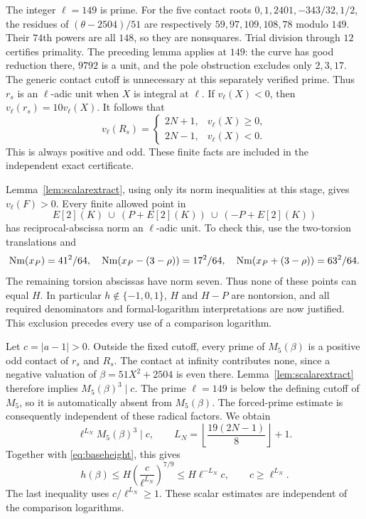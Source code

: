 \documentclass[11pt,a4paper]{article}
\begin{document}
The integer $\ell=149$ is prime. For the five contact roots
$0,1,2401,-343/32,1/2$, the residues of $(\theta-2504)/51$ are
respectively $59,97,109,108,78$ modulo $149$. Their $74$th powers
are all $148$, so they are nonsquares. Trial division through $12$
certifies primality. The preceding lemma applies at $149$: the curve
has good reduction there, $9792$ is a unit, and the pole obstruction
excludes only $2,3,17$. The generic contact cutoff is unnecessary
at this separately verified prime. Thus $r_s$ is an $\ell$-adic unit when $X$ is integral
at $\ell$. If $v_\ell(X)<0$, then $v_\ell(r_s)=10v_\ell(X)$.
It follows that
\begin{equation}\label{eq:forcedvaluation}
 v_\ell(R_s)=
 \begin{cases}2N+1,&v_\ell(X)\ge0,\\2N-1,&v_\ell(X)<0.
 \end{cases}
\end{equation}
This is always positive and odd. These finite facts are included
in the independent exact certificate.

Lemma~\ref{lem:scalarextract}, using only its norm inequalities at
this stage, gives $v_\ell(F)>0$. Every finite allowed point in
\[
                E[2](K)\ \cup\ (P+E[2](K))\ \cup\ (-P+E[2](K))
\]
has reciprocal-abscissa norm an $\ell$-adic unit. To check this,
use the two-torsion translations and
\[
 \operatorname{Nm}(x_P)=41^2/64,\quad
 \operatorname{Nm}(x_P-(3-\rho))=17^2/64,\quad
 \operatorname{Nm}(x_P+(3-\rho))=63^2/64.
\]
The remaining torsion abscissas have norm seven. Thus none of
these points can equal $H$. In particular $h\notin\{-1,0,1\}$,
$H$ and $H-P$ are nontorsion, and all required denominators and
formal-logarithm interpretations are now justified. This exclusion
precedes every use of a comparison logarithm.

Let $c=|a-1|>0$. Outside the fixed cutoff, every prime of
$M_5(\beta)$ is a positive odd contact of $r_s$ and $R_s$.
The contact at infinity contributes none, since a negative valuation
of $\beta=51X^2+2504$ is even there. Lemma~\ref{lem:scalarextract}
therefore implies $M_5(\beta)^3\mid c$. The prime $\ell=149$ is below the defining cutoff of
$M_5$, so it is automatically absent from $M_5(\beta)$.
The forced-prime estimate is consequently independent of these radical
factors. We obtain
\begin{equation}\label{eq:scalardivisibility}
 \ell^{L_N}M_5(\beta)^3\mid c,\qquad
 L_N=\left\lfloor\frac{19(2N-1)}8\right\rfloor+1.
\end{equation}
Together with \eqref{eq:baseheight}, this gives
\begin{equation}\label{eq:scalar}
 h(\beta)\le H\left(\frac{c}{\ell^{L_N}}\right)^{7/9}
             \le H\ell^{-L_N}c,
 \qquad c\ge\ell^{L_N}.
\end{equation}
The last inequality uses $c/\ell^{L_N}\ge1$. These scalar estimates
are independent of the comparison logarithms.
\end{document}
